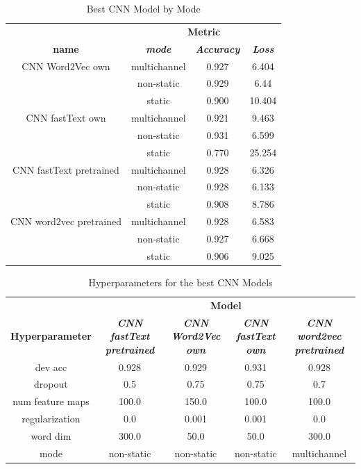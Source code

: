 \documentclass[conference]{IEEEtran}
\begin{document}
\begin{table}[htbp]
\caption{Best CNN Model by Mode}
\begin{center}
\begin{tabular}{|c|c|c|c|}
\hline
\textbf{}&\multicolumn{3}{|c|}{\textbf{Metric}} \\ 
\cline{2-4}
\textbf{name} & \textbf{\textit{mode}}& \textbf{\textit{Accuracy}}& \textbf{\textit{Loss}} \\ 
\hline
CNN Word2Vec own & multichannel & 0.927 & 6.404 \\ 
\cline{2-4}
 & non-static & 0.929 & 6.44 \\ 
\cline{2-4}
 & static & 0.900 & 10.404 \\ 
\hline
CNN fastText own & multichannel & 0.921 & 9.463 \\ 
\cline{2-4}
 & non-static & 0.931 & 6.599 \\ 
\cline{2-4}
& static & 0.770 & 25.254 \\ 
\hline
CNN fastText pretrained & multichannel & 0.928 & 6.326 \\ 
\cline{2-4}
 & non-static & 0.928 & 6.133 \\ 
\cline{2-4}
 & static & 0.908 & 8.786 \\ 
\hline
CNN word2vec pretrained & multichannel & 0.928 & 6.583 \\ 
\cline{2-4}
& non-static & 0.927 & 6.668 \\ 
\cline{2-4}
& static & 0.906 & 9.025 \\ 
\hline
\end{tabular}
\label{taba1}
\end{center}
\end{table}


\begin{table}[htbp]
\caption{Hyperparameters for the best CNN Models}
\begin{center}
\begin{tabular}{|c|c|c|c|c|}
\hline
\textbf{}&\multicolumn{4}{|c|}{\textbf{Model}} \\ 
\cline{2-5}
\textbf{Hyperparameter} & \textbf{\textit{CNN fastText pretrained}}& \textbf{\textit{CNN Word2Vec own}}& \textbf{\textit{CNN fastText own}}& \textbf{\textit{CNN word2vec pretrained}} \\ 
\hline
dev acc & 0.928 & 0.929 & 0.931 & 0.928 \\ 
\hline
dropout & 0.5 & 0.75 & 0.75 & 0.7 \\ 
\hline
num feature maps & 100.0 & 150.0 & 100.0 & 100.0 \\ 
\hline
regularization & 0.0 & 0.001 & 0.001 & 0.0 \\ 
\hline
word dim & 300.0 & 50.0 & 50.0 & 300.0 \\ 
\hline
mode & non-static & non-static & non-static & multichannel \\ 
\hline
\end{tabular}
\label{taba4}
\end{center}
\end{table}
\end{document}
